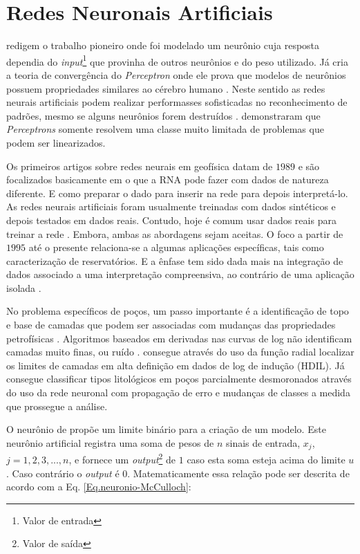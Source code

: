\section{Redes Neuronais Artificiais}

\citet{McCulloch1943} redigem o trabalho pioneiro onde foi modelado um neurônio cuja resposta dependia do \textit{input}\footnote{Valor de entrada} que provinha de outros neurônios e do peso utilizado.  Já \citet{Rosenblatt1962} cria a teoria de convergência do \textit{Perceptron} onde ele prova que modelos de neurônios possuem propriedades similares ao cérebro humano \citep{Kanal2001}. Neste sentido as redes neurais artificiais podem realizar performasses sofisticadas no reconhecimento de padrões, mesmo se alguns neurônios forem destruídos \citep{Levy1997}. \citet{Minsky1969} demonstraram que \textit{Perceptrons} somente resolvem uma classe muito limitada de problemas que podem ser linearizados.

Os primeiros artigos sobre redes neurais em geofísica datam de $1989$ e são focalizados basicamente em o que a RNA pode fazer com dados de natureza diferente. E como preparar o dado para inserir na rede para depois interpretá-lo. As redes neurais artificiais foram usualmente treinadas com dados sintéticos e depois testados em dados reais. Contudo, hoje é comum usar dados reais para treinar a rede \citep{Adibifard2014}. Embora, ambas as abordagens sejam aceitas. O foco a partir de $1995$ até o presente relaciona-se a algumas aplicações específicas, tais como caracterização de reservatórios. E a ênfase tem sido dada mais na integração de dados associado a uma interpretação compreensiva, ao contrário de uma aplicação isolada \citep{Poulton2002}. 

No problema específicos de poços, um passo importante é a identificação de topo e base de camadas que podem ser associadas com mudanças das propriedades petrofísicas \citep{Saljooghi2014}. Algoritmos baseados em derivadas nas curvas de log não identificam camadas muito finas, ou ruído \citep{Zhang1999}. \citet{Chakravarthy1999} consegue através do uso da função radial localizar os limites de camadas em alta definição em dados de log de indução (HDIL). Já \citet{Benaouda1999} consegue classificar tipos litológicos em poços parcialmente desmoronados através do uso da rede neuronal com propagação de erro e mudanças de classes a medida que prossegue a análise.

O neurônio de \citet{McCulloch1943} propõe um limite binário para a criação de um modelo. Este neurônio artificial registra uma soma de pesos de $n$ sinais de entrada, $x_{j}$, $j=1,2,3,...,n$, e fornece um \textit{output}\footnote{Valor de saída} de $1$ caso esta soma esteja acima do limite $u$. Caso contrário o \textit{output} é $0$. Matematicamente essa relação pode ser descrita de acordo com a Eq. \ref{Eq.neuronio-McCulloch}:

